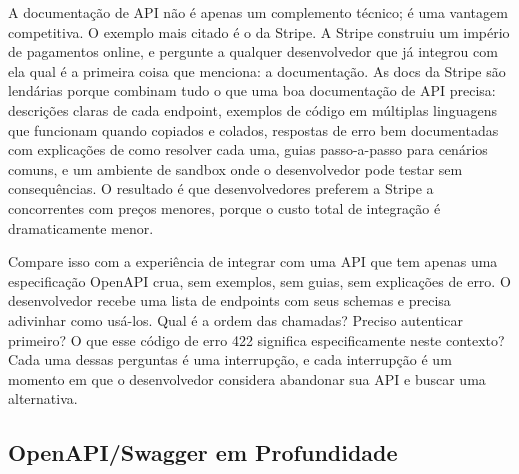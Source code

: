 A documentação de API não é apenas um complemento técnico; é uma
vantagem competitiva. O exemplo mais citado é o da Stripe. A Stripe
construiu um império de pagamentos online, e pergunte a qualquer
desenvolvedor que já integrou com ela qual é a primeira coisa que
menciona: a documentação. As docs da Stripe são lendárias porque
combinam tudo o que uma boa documentação de API precisa: descrições
claras de cada endpoint, exemplos de código em múltiplas linguagens
que funcionam quando copiados e colados, respostas de erro bem
documentadas com explicações de como resolver cada uma, guias
passo-a-passo para cenários comuns, e um ambiente de sandbox onde o
desenvolvedor pode testar sem consequências. O resultado é que
desenvolvedores preferem a Stripe a concorrentes com preços menores,
porque o custo total de integração é dramaticamente menor.

Compare isso com a experiência de integrar com uma API que tem apenas
uma especificação OpenAPI crua, sem exemplos, sem guias, sem
explicações de erro. O desenvolvedor recebe uma lista de endpoints com
seus schemas e precisa adivinhar como usá-los. Qual é a ordem das
chamadas? Preciso autenticar primeiro? O que esse código de erro 422
significa especificamente neste contexto? Cada uma dessas perguntas é
uma interrupção, e cada interrupção é um momento em que o desenvolvedor
considera abandonar sua API e buscar uma alternativa.


\subsection{OpenAPI/Swagger em Profundidade}

